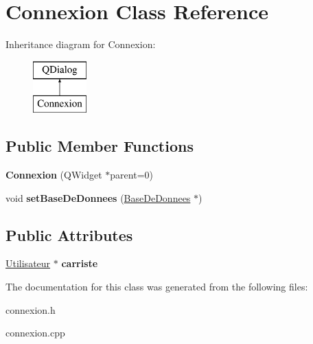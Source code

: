 \hypertarget{class_connexion}{}\section{Connexion Class Reference}
\label{class_connexion}
Inheritance diagram for Connexion\+:\begin{figure}[H]
\begin{center}
\leavevmode
\includegraphics[height=2.000000cm]{class_connexion}
\end{center}
\end{figure}
\subsection*{Public Member Functions}
\begin{DoxyCompactItemize}
\item 
\mbox{\label{class_connexion_a5dc0e175fe7561fa4b1d206ec6f5db96}} 
{\bfseries Connexion} (Q\+Widget $\ast$parent=0)
\item 
\mbox{\label{class_connexion_ac06efdc729b3c51faf35c0e8b7e0fa7d}} 
void {\bfseries set\+Base\+De\+Donnees} (\mbox{\hyperlink{class_base_de_donnees}{Base\+De\+Donnees}} $\ast$)
\end{DoxyCompactItemize}
\subsection*{Public Attributes}
\begin{DoxyCompactItemize}
\item 
\mbox{\label{class_connexion_a4ba4496266f3f38b57d7b413f2b7363f}} 
\mbox{\hyperlink{class_utilisateur}{Utilisateur}} $\ast$ {\bfseries carriste}
\end{DoxyCompactItemize}


The documentation for this class was generated from the following files\+:\begin{DoxyCompactItemize}
\item 
connexion.\+h\item 
connexion.\+cpp\end{DoxyCompactItemize}
